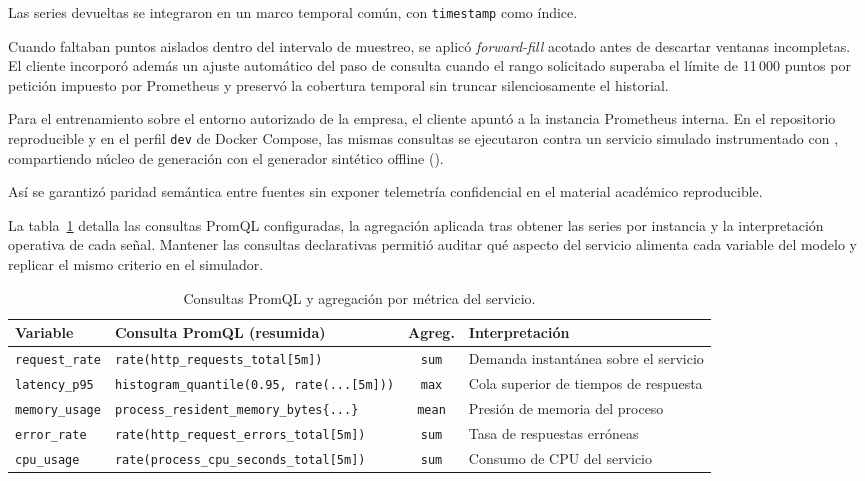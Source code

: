 Las series devueltas se integraron en un marco temporal común, con \texttt{timestamp} como índice.

Cuando faltaban puntos aislados dentro del intervalo de muestreo, se aplicó \textit{forward-fill} acotado antes de descartar ventanas incompletas. El cliente incorporó además un ajuste automático del paso de consulta cuando el rango solicitado superaba el límite de 11\,000 puntos por petición impuesto por Prometheus y preservó la cobertura temporal sin truncar silenciosamente el historial.

Para el entrenamiento sobre el entorno autorizado de la empresa, el cliente apuntó a la instancia Prometheus interna. En el repositorio reproducible y en el perfil \texttt{dev} de Docker Compose, las mismas consultas se ejecutaron contra un servicio simulado instrumentado con , compartiendo núcleo de generación con el generador sintético offline ().

Así se garantizó paridad semántica entre fuentes sin exponer telemetría confidencial en el material académico reproducible.

La tabla~\ref{tab:promql-queries} detalla las consultas PromQL configuradas, la agregación aplicada tras obtener las series por instancia y la interpretación operativa de cada señal. Mantener las consultas declarativas permitió auditar qué aspecto del servicio alimenta cada variable del modelo y replicar el mismo criterio en el simulador.

\begin{table}[h]
\centering
\footnotesize
\caption{Consultas PromQL y agregación por métrica del servicio.}
\label{tab:promql-queries}
\begin{tabular}{@{}>{\raggedright\arraybackslash}p{}>{\raggedright\arraybackslash}p{}cp{}@{}}
\toprule
\textbf{Variable} & \textbf{Consulta PromQL (resumida)} & \textbf{Agreg.} & \textbf{Interpretación} \\
\midrule
\texttt{request\_rate} & \texttt{rate(http\_requests\_\allowbreak total[5m])} & \texttt{sum} & Demanda instantánea sobre el servicio \\
\texttt{latency\_p95} & \texttt{histogram\_quantile(0.95,}\allowbreak\texttt{ rate(...[5m]))} & \texttt{max} & Cola superior de tiempos de respuesta \\
\texttt{memory\_usage} & \texttt{process\_resident\_\allowbreak memory\_bytes\{...\}} & \texttt{mean} & Presión de memoria del proceso \\
\texttt{error\_rate} & \texttt{rate(http\_request\_\allowbreak errors\_total[5m])} & \texttt{sum} & Tasa de respuestas erróneas \\
\texttt{cpu\_usage} & \texttt{rate(process\_cpu\_\allowbreak seconds\_total[5m])} & \texttt{sum} & Consumo de CPU del servicio \\
\bottomrule
\end{tabular}
\end{table}

